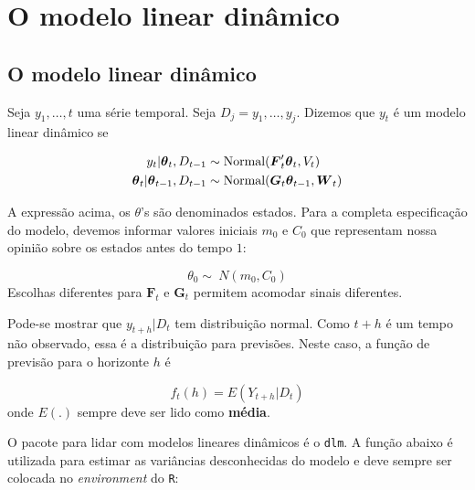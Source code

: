 \documentclass[
  letterpaper,
  DIV=11,
  numbers=noendperiod]{scrreprt}
\author{}
\date{}
\begin{document}
\ifdefined\Shaded\renewenvironment{Shaded}{\begin{tcolorbox}[boxrule=0pt, borderline west={3pt}{0pt}{shadecolor}, breakable, frame hidden, interior hidden, sharp corners, enhanced]}{\end{tcolorbox}}\fi

\hypertarget{o-modelo-linear-dinuxe2mico}{%
\chapter{O modelo linear dinâmico}\label{o-modelo-linear-dinuxe2mico}}

\hypertarget{o-modelo-linear-dinuxe2mico-1}{%
\section{O modelo linear dinâmico}\label{o-modelo-linear-dinuxe2mico-1}}

Seja \(y_1,\ldots,t\) uma série temporal. Seja \(D_j={y_1,\ldots,y_j}\).
Dizemos que \(y_t\) é um modelo linear dinâmico se

\[\begin{align}
y_t|\boldsymbol{\theta}_t,D_{t-1}&\sim\hbox{Normal}(\boldsymbol{F}_t'\boldsymbol{\theta}_t,V_t)\\
\boldsymbol{\theta}_t|\boldsymbol{\theta}_{t-1},D_{t-1}&\sim\hbox{Normal}(\boldsymbol{G}_t\boldsymbol{\theta}_{t-1},\boldsymbol{W}_t)
\end{align}\]

A expressão acima, os \(\theta\)'s são denominados estados. Para a
completa especificação do modelo, devemos informar valores iniciais
\(m_0\) e \(C_0\) que representam nossa opinião sobre os estados antes
do tempo \(1\):

\[\theta_0\sim\ N(m_0,C_0)\] Escolhas diferentes para
\(\boldsymbol{F}_t\) e \(\boldsymbol{G}_t\) permitem acomodar sinais
diferentes.

Pode-se mostrar que \(y_{t+h}|D_t\) tem distribuição normal. Como
\(t+h\) é um tempo não observado, essa é a distribuição para previsões.
Neste caso, a função de previsão para o horizonte \(h\) é

\[f_t(h)=E(Y_{t+h}|D_{t})\] onde \(E(.)\) sempre deve ser lido como
\textbf{média}.

O pacote para lidar com modelos lineares dinâmicos é o \texttt{dlm}. A
função abaixo é utilizada para estimar as variâncias desconhecidas do
modelo e deve sempre ser colocada no \emph{environment} do \texttt{R}:
\end{document}
